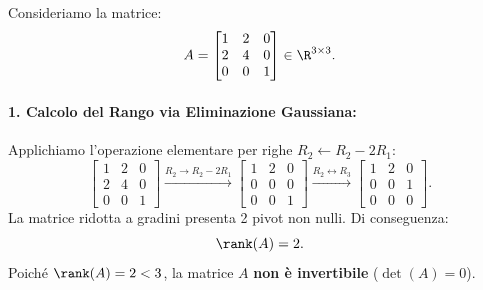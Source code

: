 \begin{example}
Consideriamo la matrice:
\begin{equation}
    A = \begin{bmatrix} 1 & 2 & 0 \\ 2 & 4 & 0 \\ 0 & 0 & 1 \end{bmatrix} \in \R^{3 \times 3}.
\end{equation}

\paragraph{1. Calcolo del Rango via Eliminazione Gaussiana:}
Applichiamo l'operazione elementare per righe $R_2 \leftarrow R_2 - 2R_1$:
\begin{equation}
    \begin{bmatrix} 1 & 2 & 0 \\ 2 & 4 & 0 \\ 0 & 0 & 1 \end{bmatrix}
    \xrightarrow{R_2 \to R_2 - 2R_1}
    \begin{bmatrix} 1 & 2 & 0 \\ 0 & 0 & 0 \\ 0 & 0 & 1 \end{bmatrix}
    \xrightarrow{R_2 \leftrightarrow R_3}
    \begin{bmatrix} 1 & 2 & 0 \\ 0 & 0 & 1 \\ 0 & 0 & 0 \end{bmatrix}.
\end{equation}
La matrice ridotta a gradini presenta 2 pivot non nulli. Di conseguenza:
\begin{equation}
    \rank(A) = 2.
\end{equation}
Poich\'e $\rank(A) = 2 < 3$, la matrice $A$ \textbf{non \`e invertibile} ($\det(A) = 0$).


\end{example}

